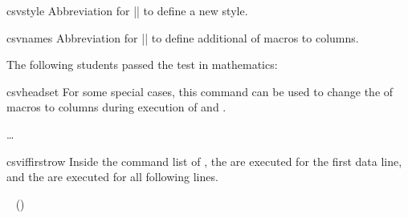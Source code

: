 \documentclass[a4paper,11pt]{ltxdoc}
\begin{document}
\begin{docCommand}{csvstyle}{}
  Abbreviation for ||
  to define a new style.
\end{docCommand}

\begin{docCommand}{csvnames}{}
  Abbreviation for ||
  to define additional  of macros to columns.
\begin{dispExample}

The following students passed the test in mathematics:
%
\end{dispExample}
\end{docCommand}


\begin{docCommand}{csvheadset}{}
  For some special cases, this command can be used to change the
   of macros to columns during execution of
   and .
\begin{dispExample}
%
  {  \fbox{\n}
     \ldots\ \fbox{\n}  }%
\end{dispExample}
\end{docCommand}

\clearpage

\begin{docCommand}{csviffirstrow}{}
  Inside the command list of , the 
  are executed for the first data line, and the 
  are executed for all following lines.
\begin{dispExample}
%
  {\givenname~\name \> ()}
\end{dispExample}
\end{docCommand}
\end{document}
